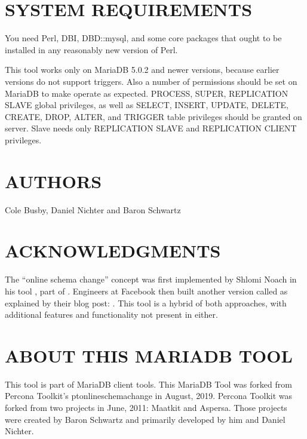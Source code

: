 \documentclass[letterpaper,10pt,english]{sphinxmanual}
\begin{document}
\section{SYSTEM REQUIREMENTS}
\label{\detokenize{mariadb-schema-change:system-requirements}}
\sphinxAtStartPar
You need Perl, DBI, DBD::mysql, and some core packages that ought to be
installed in any reasonably new version of Perl.

\sphinxAtStartPar
This tool works only on MariaDB 5.0.2 and newer versions, because earlier versions
do not support triggers. Also a number of permissions should be set on MariaDB
to make  operate as expected. PROCESS, SUPER, REPLICATION SLAVE
global privileges, as well as SELECT, INSERT, UPDATE, DELETE, CREATE, DROP, ALTER,
and TRIGGER table privileges should be granted on server. Slave needs only
REPLICATION SLAVE and REPLICATION CLIENT privileges.


\section{AUTHORS}
\label{\detokenize{mariadb-schema-change:authors}}
\sphinxAtStartPar
Cole Busby, Daniel Nichter and Baron Schwartz


\section{ACKNOWLEDGMENTS}
\label{\detokenize{mariadb-schema-change:acknowledgments}}
\sphinxAtStartPar
The “online schema change” concept was first implemented by Shlomi Noach
in his tool , part of
.  Engineers at Facebook then built
another version called  as explained by their blog
post: . This tool is a hybrid of both approaches,
with additional features and functionality not present in either.


\section{ABOUT THIS MARIADB TOOL}
\label{\detokenize{mariadb-schema-change:about-this-mariadb-tool}}
\sphinxAtStartPar
This tool is part of MariaDB client tools. This MariaDB Tool was forked from
Percona Toolkit’s pt\sphinxhyphen{}online\sphinxhyphen{}schema\sphinxhyphen{}change in August, 2019. Percona Toolkit was
forked from two projects in June, 2011: Maatkit and Aspersa.  Those projects
were created by Baron Schwartz and primarily developed by him and Daniel Nichter.
\end{document}
